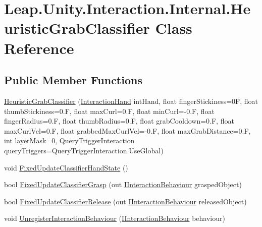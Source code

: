 \hypertarget{class_leap_1_1_unity_1_1_interaction_1_1_internal_1_1_heuristic_grab_classifier}{}\section{Leap.\+Unity.\+Interaction.\+Internal.\+Heuristic\+Grab\+Classifier Class Reference}
\label{class_leap_1_1_unity_1_1_interaction_1_1_internal_1_1_heuristic_grab_classifier}
\subsection*{Public Member Functions}
\begin{DoxyCompactItemize}
\item 
\mbox{\hyperlink{class_leap_1_1_unity_1_1_interaction_1_1_internal_1_1_heuristic_grab_classifier_a6ec6f734b62f6ef4b18af44906aeebdd}{Heuristic\+Grab\+Classifier}} (\mbox{\hyperlink{class_leap_1_1_unity_1_1_interaction_1_1_interaction_hand}{Interaction\+Hand}} int\+Hand, float finger\+Stickiness=0\+F, float thumb\+Stickiness=0.\+F, float max\+Curl=0.\+F, float min\+Curl=-\/0.\+F, float finger\+Radius=0.\+F, float thumb\+Radius=0.\+F, float grab\+Cooldown=0.\+F, float max\+Curl\+Vel=0.\+F, float grabbed\+Max\+Curl\+Vel=-\/0.\+F, float max\+Grab\+Distance=0.\+F, int layer\+Mask=0, Query\+Trigger\+Interaction query\+Triggers=\+Query\+Trigger\+Interaction.\+Use\+Global)
\item 
void \mbox{\hyperlink{class_leap_1_1_unity_1_1_interaction_1_1_internal_1_1_heuristic_grab_classifier_ae3d0c844b6f3a40df35e6a2c71efbefd}{Fixed\+Update\+Classifier\+Hand\+State}} ()
\item 
bool \mbox{\hyperlink{class_leap_1_1_unity_1_1_interaction_1_1_internal_1_1_heuristic_grab_classifier_ad958ef46c9aacf8fa7646fb52329f266}{Fixed\+Update\+Classifier\+Grasp}} (out \mbox{\hyperlink{interface_leap_1_1_unity_1_1_interaction_1_1_i_interaction_behaviour}{I\+Interaction\+Behaviour}} grasped\+Object)
\item 
bool \mbox{\hyperlink{class_leap_1_1_unity_1_1_interaction_1_1_internal_1_1_heuristic_grab_classifier_a188485d78695a6f187e7c28532548033}{Fixed\+Update\+Classifier\+Release}} (out \mbox{\hyperlink{interface_leap_1_1_unity_1_1_interaction_1_1_i_interaction_behaviour}{I\+Interaction\+Behaviour}} released\+Object)
\item 
void \mbox{\hyperlink{class_leap_1_1_unity_1_1_interaction_1_1_internal_1_1_heuristic_grab_classifier_a40a2327dbe8e9ec05bf97fbb32ed9324}{Unregister\+Interaction\+Behaviour}} (\mbox{\hyperlink{interface_leap_1_1_unity_1_1_interaction_1_1_i_interaction_behaviour}{I\+Interaction\+Behaviour}} behaviour)

\end{DoxyCompactItemize}
